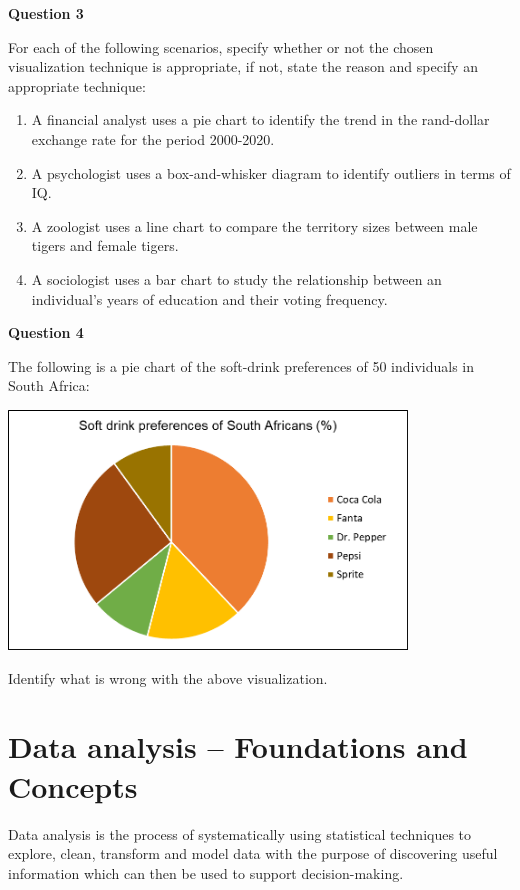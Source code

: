 \documentclass[
]{book}
\begin{document}
\textbf{Question 3}

For each of the following scenarios, specify whether or not the chosen visualization technique is appropriate, if not, state the reason and specify an appropriate technique:

\begin{enumerate}
\def\labelenumi{\alph{enumi}.}
\item
  A financial analyst uses a pie chart to identify the trend in the rand-dollar exchange rate for the period 2000-2020.
\item
  A psychologist uses a box-and-whisker diagram to identify outliers in terms of IQ.
\item
  A zoologist uses a line chart to compare the territory sizes between male tigers and female tigers.
\item
  A sociologist uses a bar chart to study the relationship between an individual's years of education and their voting frequency.
\end{enumerate}

\textbf{Question 4}

The following is a pie chart of the soft-drink preferences of 50 individuals in South Africa:

\includegraphics[width=4.16667in,height=\textheight]{images/clipboard-2887671888.png}

Identify what is wrong with the above visualization.

\section{Data analysis -- Foundations and Concepts}\label{data-analysis-foundations-and-concepts}

Data analysis is the process of systematically using statistical techniques to explore, clean, transform and model data with the purpose of discovering useful information which can then be used to support decision-making.
\end{document}

